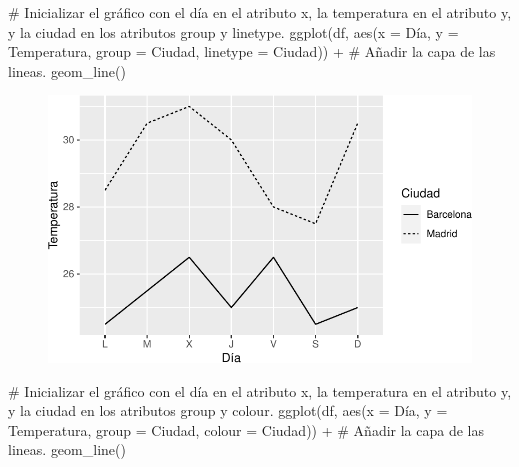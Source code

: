 \documentclass[
  a4paper,
]{scrreport}
\newenvironment{Shaded}{\begin{snugshade}}{\end{snugshade}}
\newcommand{\AttributeTok}[1]{\textcolor[rgb]{0.40,0.45,0.13}{#1}}
\newcommand{\CommentTok}[1]{\textcolor[rgb]{0.37,0.37,0.37}{#1}}
\newcommand{\FunctionTok}[1]{\textcolor[rgb]{0.28,0.35,0.67}{#1}}
\newcommand{\NormalTok}[1]{\textcolor[rgb]{0.00,0.23,0.31}{#1}}
\newcommand{\SpecialCharTok}[1]{\textcolor[rgb]{0.37,0.37,0.37}{#1}}
\theoremstyle{definition}
\theoremstyle{definition}
\theoremstyle{remark}
\begin{document}
\begin{Shaded}
\begin{Highlighting}[]
\CommentTok{\# Inicializar el gráfico con el día en el atributo x, la temperatura en el atributo y, y la ciudad en los atributos group y linetype.}
\FunctionTok{ggplot}\NormalTok{(df, }\FunctionTok{aes}\NormalTok{(}\AttributeTok{x =}\NormalTok{ Día, }\AttributeTok{y =}\NormalTok{ Temperatura, }\AttributeTok{group =}\NormalTok{ Ciudad, }\AttributeTok{linetype =}\NormalTok{ Ciudad)) }\SpecialCharTok{+}
\CommentTok{\# Añadir la capa de las lineas.}
    \FunctionTok{geom\_line}\NormalTok{()}
\end{Highlighting}
\end{Shaded}

\begin{figure}[H]

{\centering \includegraphics{./07-graficos_files/figure-pdf/unnamed-chunk-7-1.pdf}

}

\end{figure}

\begin{Shaded}
\begin{Highlighting}[]
\CommentTok{\# Inicializar el gráfico con el día en el atributo x, la temperatura en el atributo y, y la ciudad en los atributos group y colour.}
\FunctionTok{ggplot}\NormalTok{(df, }\FunctionTok{aes}\NormalTok{(}\AttributeTok{x =}\NormalTok{ Día, }\AttributeTok{y =}\NormalTok{ Temperatura, }\AttributeTok{group =}\NormalTok{ Ciudad, }\AttributeTok{colour =}\NormalTok{ Ciudad)) }\SpecialCharTok{+}
\CommentTok{\# Añadir la capa de las lineas.}
    \FunctionTok{geom\_line}\NormalTok{()}
\end{Highlighting}
\end{Shaded}
\end{document}
